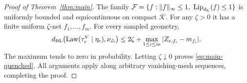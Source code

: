 \begin{proof}[Proof of Theorem~\ref{thm:main}]
The family
$\mathcal F=\{f:\|f\|_\infty\le1,\ \operatorname{Lip}_{d_{\mathcal K}}(f)\le1\}$
is uniformly bounded and equicontinuous on compact $\mathcal K$.
For any $\zeta>0$ it has a finite uniform $\zeta$-net
$f_1,\ldots,f_m$. For every sampled geometry,
\[
 d_{\mathrm{BL}}\bigl(\operatorname{Law}(\tau_e^V\mid\eta_e),\nu_\triangle\bigr)
 \le 2\zeta+\max_{1\le i\le m}|Z_{e,f_i}-m_{f_i}|.
\]
The maximum tends to zero in probability. Letting $\zeta\downarrow0$
proves \eqref{eq:main-quenched}. All arguments apply along arbitrary
vanishing-mesh sequences, completing the proof.
\end{proof}
